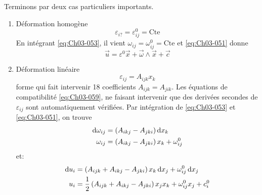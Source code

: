 Terminons par deux cas particuliers importants.
\begin{enumerate}
    \item Déformation homogène
        \begin{equation}
            \varepsilon_{i?} = \varepsilon_{ij}^0 = \text{Cte}
            \label{eq:Ch03-061}
        \end{equation}
        En intégrant \eqref{eq:Ch03-053}, il vient $\omega_{ij} = \omega_{ij}^0 = \text{Cte}$ et \eqref{eq:Ch03-051} donne
        \begin{equation}
            \vec{u} = \mathbb{\varepsilon}^0 \vec{x} + \vec{\omega} \wedge \vec{x} + \vec{c}
            \label{eq:Ch03-062}
        \end{equation}
    \item Déformation linéaire
        \begin{equation}
            \varepsilon_{ij} = A_{ijk} x_k
            \label{eq:Ch03-063}
        \end{equation}
        forme qui fait intervenir 18 coefficients $A_{ijk} = A_{jik}$.
        Les équations de compatibilité \eqref{eq:Ch03-059}, ne faisant intervenir que des derivées secondes de $\varepsilon_{ij}$ sont automatiquement vérifiées.
        Par intégration de \eqref{eq:Ch03-053} et \eqref{eq:Ch03-051}, on trouve
        \begin{equation}
            \begin{aligned}
                \mathop{\mathrm{{}d}}\mathopen{} \omega_{ij} &= \left( A_{ikj} - A_{jki} \right) \mathop{\mathrm{{}d}}\mathopen{} x_k \\
                \omega_{ij} &= \left( A_{ikj} - A_{jki} \right) x_k + \omega_{ij}^0
            \end{aligned}
            \label{eq:Ch03-064}
        \end{equation}
et:
        \begin{equation}
            \begin{aligned}
                \mathop{\mathrm{{}d}}\mathopen{} u_i &= \left( A_{ijk} + A_{ikj} - A_{jki} \right) x_k \mathop{\mathrm{{}d}}\mathopen{} x_j + \omega_{ij}^0 \mathop{\mathrm{{}d}}\mathopen{} x_j \\
                u_i &= \frac{1}{2} \left( A_{ijk} + A_{ikj} - A_{jki} \right) x_j x_k + \omega_{ij}^0 x_j + c_i^0
            \end{aligned}
            \label{eq:Ch03-065}
        \end{equation}
\end{enumerate}
